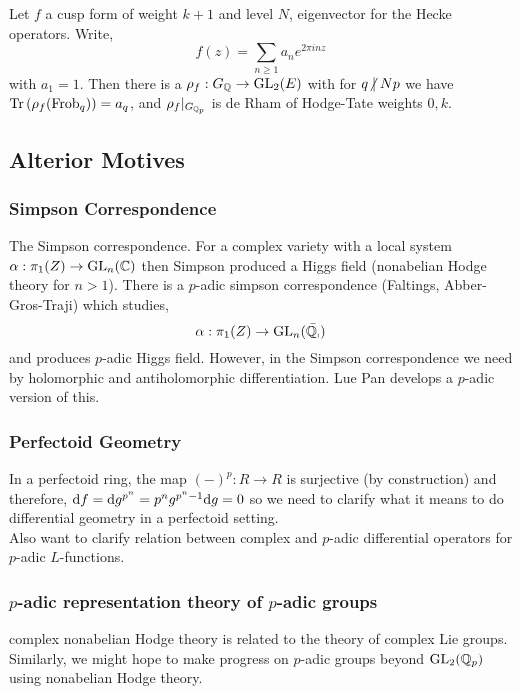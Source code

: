 \documentclass[12pt]{article}
\begin{document}
\begin{thm}
Let $f$ a cusp form of weight $k+1$ and level $N$, eigenvector for the Hecke operators. Write,
\[ f(z) = \sum_{n \ge 1} a_n e^{2 \pi i n z} \]
with $a_1 = 1$. Then there is a $\rho_f : G_{\mathbb{Q}} \to \mathrm{GL}_2(E)$ with for $q \ndivides N p$ we have $\mathrm{Tr}\left( \rho_f(\mathrm{Frob}_q) \right) = a_q$, and $\rho_f |_{G_{\mathbb{Q}_p}}$ is de Rham of Hodge-Tate weights $0,k$. 
\end{thm}

\subsection{Alterior Motives}

\subsubsection{Simpson Correspondence}

The Simpson correspondence. For a complex variety with a local system $\alpha : \pi_1(Z) \to \mathrm{GL}_n(\mathbb{C})$ then Simpson produced a Higgs field (nonabelian Hodge theory for $n > 1$). There is a $p$-adic simpson correspondence (Faltings, Abber-Gros-Traji) which studies,
\[ \alpha : \pi_1(Z) \to \mathrm{GL}_n(\bar{\mathbb{Q}_p}) \]
and produces $p$-adic Higgs field. However, in the Simpson correspondence we need by holomorphic and antiholomorphic differentiation. Lue Pan develops a $p$-adic version of this. 

\subsubsection{Perfectoid Geometry}

In a perfectoid ring, the map $(-)^p : R \to R$ is surjective (by construction) and therefore, $\mathrm{d}{f} = \mathrm{d}{g^{p^n}} = p^n g^{p^n-1} \mathrm{d}{g} = 0$ so we need to clarify what it means to do differential geometry in a perfectoid setting.
\bigskip\\
Also want to clarify relation between complex and $p$-adic differential operators for $p$-adic $L$-functions.

\subsubsection{$p$-adic representation theory of $p$-adic groups}

complex nonabelian Hodge theory is related to the theory of complex Lie groups. Similarly, we might hope to make progress on $p$-adic groups beyond $\mathrm{GL}_2(\mathbb{Q}_p)$ using nonabelian Hodge theory. 
\end{document}
